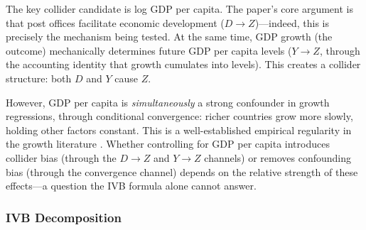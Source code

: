 \documentclass[
]{article}
\begin{document}
The key collider candidate is log GDP per capita. The paper's core
argument is that post offices facilitate economic development
(\(D \to Z\))---indeed, this is precisely the mechanism being tested. At
the same time, GDP growth (the outcome) mechanically determines future
GDP per capita levels (\(Y \to Z\), through the accounting identity that
growth cumulates into levels). This creates a collider structure: both
\(D\) and \(Y\) cause \(Z\).

However, GDP per capita is \textit{simultaneously} a strong confounder
in growth regressions, through conditional convergence: richer countries
grow more slowly, holding other factors constant. This is a
well-established empirical regularity in the growth literature
\citep{acemoglu_etal2019}. Whether controlling for GDP per capita
introduces collider bias (through the \(D \to Z\) and \(Y \to Z\)
channels) or removes confounding bias (through the convergence channel)
depends on the relative strength of these effects---a question the IVB
formula alone cannot answer.

\subsubsection{IVB Decomposition}\label{ivb-decomposition-1}
\end{document}
